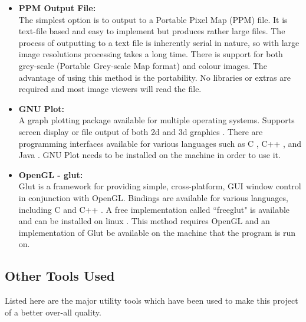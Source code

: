 \begin{itemize}
\item \textbf{PPM Output File:} \\
              The simplest option is to output to a Portable Pixel Map (PPM) file. It is 
              text-file based and easy to implement but produces rather large files. 
              The process of outputting to a text file is inherently serial in nature,
              so with large image resolutions processing takes a long time.
              There is support for both grey-scale (Portable Grey-scale Map format) and colour images. 
              The advantage of using this method is the portability. No libraries or extras are required
              and most image viewers will read the file. \cite{ppmspec}
              
\item \textbf{GNU Plot:} \\
              A graph plotting package available for multiple operating systems. 
              Supports screen display or file output of both 2d and 3d graphics \cite{gnuplot}.
              There are programming interfaces available for various languages such as C \cite{gnuplotcint}, C++ \cite{gnuplotcppint}, 
              and Java \cite{gnuplotjint}.
              GNU Plot needs to be installed on the machine in order to use it.
              
\item \textbf{OpenGL - glut:} \\
              Glut is a framework for providing simple, cross-platform, GUI window control in conjunction
              with OpenGL. Bindings are available for various languages, including C and C++ \cite{openglglut}.
              A free implementation called ``freeglut" is available and can be installed on linux \cite{freeglut}.
              This method requires OpenGL and an implementation of Glut be available on the machine that the program 
              is run on.
              
\end{itemize}

\subsection*{Other Tools Used}

Listed here are the major utility tools which have been used to make this project of a better over-all 
quality. 

